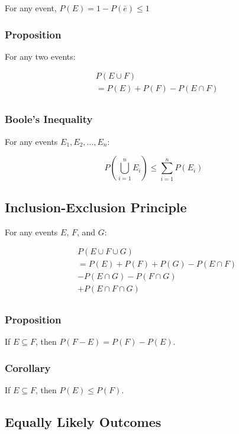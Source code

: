For any event, $P(E) = 1 - P(\bar{e}) \leq 1$

\subsubsection*{Proposition}

For any two events:

\begin{align*}
     & P(E \cup F)                 \\
     & = P(E) + P(F) - P(E \cap F) \\
\end{align*}

\subsubsection*{Boole's Inequality}

For any events $E_1, E_2, \dots, E_n$:

$$ P\left(\bigcup_{i=1}^{n} E_i\right) \leq \sum_{i=1}^{n} P(E_i) $$

\subsection*{Inclusion-Exclusion Principle}

For any events $E$, $F$, and $G$:

\begin{align*}
     & P(E \cup F \cup G)                 \\
     & = P(E) + P(F) + P(G) - P(E \cap F) \\
     & - P(E \cap G) - P(F \cap G)        \\
     & + P(E \cap F \cap G)               \\
\end{align*}

\subsubsection*{Proposition}

If $E \subseteq F$, then $P(F-E) = P(F) - P(E)$.

\subsubsection*{Corollary}

If $E \subseteq F$, then $P(E) \leq P(F)$.

\subsection*{Equally Likely Outcomes}


